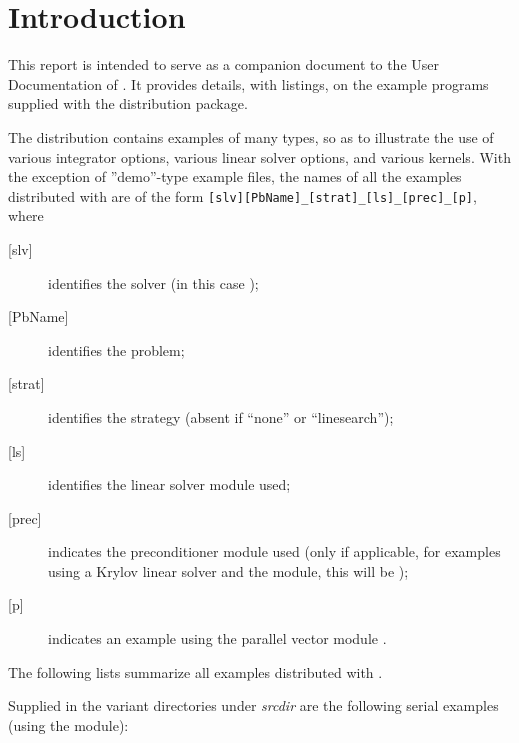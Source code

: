 \section{Introduction}\label{s:ex_intro}

This report is intended to serve as a companion document to the User
Documentation of {\kinsol} \cite{kinsol_ug}.  It provides details, with
listings, on the example programs supplied with the {\kinsol} distribution
package.

The {\kinsol} distribution contains examples of many types, so as to
illustrate the use of various integrator options, various linear solver
options, and various {\nvector} kernels.
With the exception of ''demo''-type example files, the names of all the examples 
distributed with {\sundials} are of the form
\verb![slv][PbName]_[strat]_[ls]_[prec]_[p]!, where
\begin{description}
\item [{[slv]}] identifies the solver (in this case );
\item [{[PbName]}] identifies the problem;
\item [{[strat]}] identifies the strategy (absent if ``none'' or ``linesearch'');
\item [{[ls]}] identifies the linear solver module used;
\item [{[prec]}] indicates the {\kinsol} preconditioner module used
  (only if applicable, for examples using a Krylov linear solver
  and the {\kinbbdpre} module, this will be );
\item [{[p]}] indicates an example using the parallel vector module {\nvecp}.
\end{description}

\vspace{0.2in}\noindent
The following lists summarize all examples distributed with {\kinsol}.

\vspace{0.2in}\noindent
Supplied in the  variant directories under
{\em srcdir} are the following serial examples (using the
{\nvecs} module):

